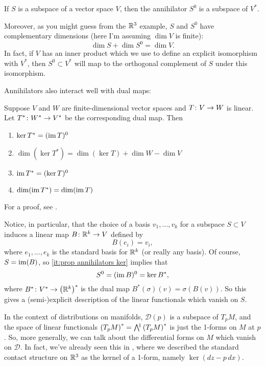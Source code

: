 \begin{proposition}\label{prop:annihilator is subspace}
	If $S$ is a subspace of a vector space $V$, then the annihilator $S^0$ is a subspace of $V^\ast$.
\end{proposition}

Moreover, as you might guess from the $\mathbb{R}^3$ example, $S$ and $S^0$ have complementary dimensions (here I'm assuming $\dim V$ is finite):
\[
	\dim S + \dim S^0 = \dim V.
\]
In fact, if $V$ has an inner product which we use to define an explicit isomorphism with $V^\ast$, then $S^0 \subset V^\ast$ will map to the orthogonal complement of $S$ under this isomorphism.

Annihilators also interact well with dual maps:

\begin{proposition}\label{prop:annihilators and duals}
	Suppose $V$ and $W$ are finite-dimensional vector spaces and $T \colon\thinspace\! V \to W$ is linear. Let $T^\ast \colon\thinspace\! W^\ast \to V^\ast$ be the corresponding dual map. Then
	\begin{enumerate}
		\item \label{it:prop annihilators ker} $\ker T^\ast = (\operatorname{im} T)^0$
		\item $\dim (\ker T^\ast) = \dim (\ker T) + \dim W - \dim V$
		\item $\operatorname{im} T^\ast = (\ker T)^0$
		\item $\dim(\operatorname{im} T^\ast) = \dim (\operatorname{im} T)$
	\end{enumerate}
\end{proposition}
For a proof, see \cite[\S 3.F]{axlerLinearAlgebraDone2015}.

Notice, in particular, that the choice of a basis $v_1, \dots , v_k$ for a subspace $S \subset V$ induces a linear map $B \colon\thinspace\! \mathbb{R}^k \to V$ defined by
\[
	B(e_i) = v_i,
\]
where $e_1, \dots , e_k$ is the standard basis for $\mathbb{R}^k$ (or really any basis). Of course, $S = \operatorname{im}(B)$, so \ref{it:prop annihilators ker} implies that
\[
	S^0 = (\operatorname{im} B)^0 = \ker B^\ast,
\]
where $B^\ast \colon\thinspace\! V^\ast \to \left(\mathbb{R}^k\right)^\ast$ is the dual map $B^\ast(\sigma)(v) = \sigma(B(v))$. So this gives a (semi-)explicit description of the linear functionals which vanish on $S$.

In the context of distributions on manifolds, $\mathcal{D}(p)$ is a subspace of $T_pM$, and the space of linear functionals $\left(T_pM\right)^\ast = \ext{1}\left(T_pM\right)^\ast$ is just the 1-forms on $M$ at $p$. So, more generally, we can talk about the differential forms on $M$ which vanish on $\mathcal{D}$. In fact, we've already seen this in , where we described the standard contact structure on $\mathbb{R}^3$ as the kernel of a 1-form, namely $\ker(dz - p\, dx)$.

